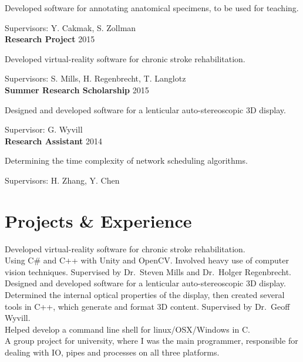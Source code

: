 \documentclass[a4paper, oneside, final]{scrartcl}
\begin{document}
	Developed software for annotating anatomical specimens, to be used for teaching.
    
    Supervisors: Y. Cakmak, S. Zollman \\
    
    \noindent
    \textbf{Research Project} \hfill 2015 \hfill
    
	Developed virtual-reality software for chronic stroke rehabilitation.
    
    Supervisors: S. Mills, H. Regenbrecht, T. Langlotz\\
    
    \noindent
    \textbf{Summer Research Scholarship} \hfill 2015 \hfill
    
	Designed and developed software for a lenticular auto-stereoscopic 3D display.
    
    Supervisor: G. Wyvill\\
    
    \noindent
    \textbf{Research Assistant} \hfill 2014 \hfill
    
	Determining the time complexity of network scheduling algorithms.
    
    Supervisors: H. Zhang, Y. Chen
    
	
    \iffalse
    \section{Projects \& Experience}
    
    \noindent        
	Developed virtual-reality software for chronic stroke rehabilitation.\\
	Using C\# and C++ with Unity and OpenCV. Involved heavy use of computer\\ vision techniques. Supervised by Dr.\ Steven Mills and Dr.\ Holger Regenbrecht.\\
    
	\noindent
	Designed and developed software for a lenticular auto-stereoscopic 3D display.\\ 
	Determined the internal optical properties of the display, then created several tools in C++, which generate and format 3D content. Supervised by Dr.\ Geoff Wyvill.\\

	\noindent
	Helped develop a command line shell for linux/OSX/Windows in C.\\
	A group project for university, where I was the main programmer, responsible for dealing with IO, pipes and processes on all three platforms.\\
\end{document}
